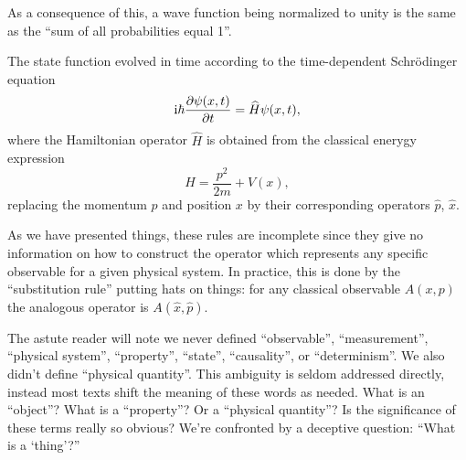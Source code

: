 \begin{remark}
As a consequence of this, a wave function being normalized to unity is
the same as the ``sum of all probabilities equal 1''.
\end{remark}

The state function evolved in time according to the time-dependent
Schr\"{o}dinger equation
\begin{equation}
\mathrm{i}\hbar\frac{\partial\psi(x,t)}{\partial t} = \widehat{H}\psi(x,t),
\end{equation}
where the Hamiltonian operator $\widehat{H}$ is obtained from the
classical enerygy expression
\begin{equation}
H = \frac{p^{2}}{2m} + V(x),
\end{equation}
replacing the momentum $p$ and position $x$ by their corresponding
operators $\widehat{p}$, $\widehat{x}$.

As we have presented things, these rules are incomplete since they give
no information on how to construct the operator which represents any
specific observable for a given physical system. In practice, this is
done by the ``substitution rule'' putting hats on things: for any
classical observable $A(x, p)$ the analogous operator is
$A(\widehat{x},\widehat{p})$. 

\begin{danger}
The astute reader will note we never defined ``observable'',
``measurement'', ``physical system'', ``property'', ``state'',
``causality'', or ``determinism''. We also didn't define ``physical quantity''.
This ambiguity is seldom addressed directly, instead most texts shift
the meaning of these words as needed. What is an ``object''? What is a
``property''? Or a ``physical quantity''? Is the significance of these
terms really so obvious? We're confronted by a deceptive question: ``What
is a `thing'?''
\end{danger}






